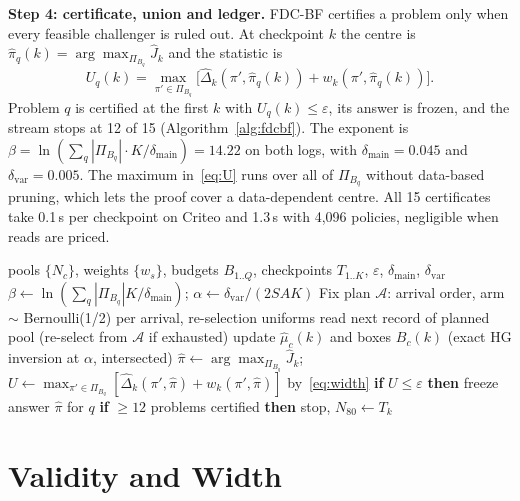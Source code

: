 \documentclass[sigconf,anonymous,review]{acmart}
\newcommand{\cA}{\mathcal{A}}
\newcommand{\eps}{\varepsilon}
\newcommand{\dmain}{\delta_{\text{main}}}
\newcommand{\dvar}{\delta_{\text{var}}}
\begin{document}
\textbf{Step 4: certificate, union and ledger.} FDC-BF certifies a problem only when every feasible challenger is ruled out. At checkpoint $k$ the centre is $\hat\pi_q(k) = \arg\max_{\Pi_{B_q}} \hat J_k$ and the statistic is
\begin{equation}\label{eq:U}
U_q(k) = \max_{\pi' \in \Pi_{B_q}}\big[\hat\Delta_k(\pi', \hat\pi_q(k)) + w_k(\pi', \hat\pi_q(k))\big].
\end{equation}
Problem $q$ is certified at the first $k$ with $U_q(k) \le \eps$, its answer is frozen, and the stream stops at 12 of 15 (Algorithm~\ref{alg:fdcbf}). The exponent is $\beta = \ln(\sum_q |\Pi_{B_q}| \cdot K/\dmain) = 14.22$ on both logs, with $\dmain = 0.045$ and $\dvar = 0.005$. The maximum in~\eqref{eq:U} runs over all of $\Pi_{B_q}$ without data-based pruning, which lets the proof cover a data-dependent centre. All 15 certificates take 0.1\,s per checkpoint on Criteo and 1.3\,s with 4,096 policies, negligible when reads are priced.

\begin{algorithm}[t]
\caption{FDC-BF (stop at 12/15; omit line 10 for the full-horizon window).}
\label{alg:fdcbf}
\small
\begin{algorithmic}[1]
\Require pools $\{N_c\}$, weights $\{w_s\}$, budgets $B_{1..Q}$, checkpoints $T_{1..K}$, $\eps$, $\dmain$, $\dvar$
\State $\beta \gets \ln(\sum_q |\Pi_{B_q}| K/\dmain)$; $\alpha \gets \dvar/(2SAK)$
\State Fix plan $\cA$: arrival order, arm $\sim$ Bernoulli(1/2) per arrival, re-selection uniforms
  \State read next record of planned pool (re-select from $\cA$ if exhausted)
    \State update $\hat\mu_c(k)$ and boxes $B_c(k)$ (exact HG inversion at $\alpha$, intersected)
      \State $\hat\pi \gets \arg\max_{\Pi_{B_q}} \hat J_k$; $U \gets \max_{\pi'\in\Pi_{B_q}} [\hat\Delta_k(\pi',\hat\pi) + w_k(\pi',\hat\pi)]$ by~\eqref{eq:width}
      \State \textbf{if} $U \le \eps$ \textbf{then} freeze answer $\hat\pi$ for $q$
    \EndFor
    \State \textbf{if} $\ge 12$ problems certified \textbf{then} stop, $N_{80} \gets T_k$
  \EndIf
\EndFor
\end{algorithmic}
\end{algorithm}

\section{Validity and Width}\label{sec:validity}
\end{document}
